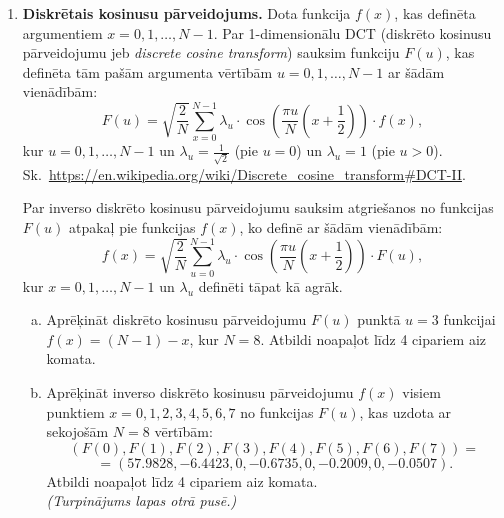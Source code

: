 \documentclass[a4paper]{article}
\begin{document}
\begin{enumerate}
\item {\bf Diskrētais kosinusu pārveidojums.}
Dota funkcija $f(x)$, kas definēta argumentiem $x=0,1,\ldots,N-1$. 
Par 1-dimensionālu DCT (diskrēto kosinusu pārveidojumu jeb {\em discrete cosine transform}) sauksim 
funkciju $F(u)$, kas definēta tām pašām argumenta vērtībām $u=0,1,\ldots,N-1$ 
ar šādām vienādībām: 
$$F(u) = \sqrt{\frac{2}{N}} \sum\limits_{x=0}^{N-1} \lambda_u \cdot \cos \left( \frac{\pi u}{N}\left(  x+\frac{1}{2} \right) \right) \cdot f(x),$$
kur $u=0,1,\ldots,N-1$ un $\lambda_u = \frac{1}{\sqrt{2}}$ (pie $u=0$) un $\lambda_u = 1$ (pie $u>0$).\\
Sk.\ \url{https://en.wikipedia.org/wiki/Discrete_cosine_transform#DCT-II}.

Par inverso diskrēto kosinusu pārveidojumu sauksim atgriešanos no funkcijas $F(u)$ atpakaļ pie funkcijas $f(x)$, 
ko definē ar šādām vienādībām:
$$f(x) = \sqrt{\frac{2}{N}} \sum\limits_{u=0}^{N-1} \lambda_u \cdot \cos \left( \frac{\pi u}{N}\left(  x+\frac{1}{2} \right) \right) \cdot F(u),$$
kur $x=0,1,\ldots,N-1$ un $\lambda_u$ definēti tāpat kā agrāk.
\begin{enumerate}[(a)]
\item 
Aprēķināt diskrēto kosinusu pārveidojumu $F(u)$ punktā $u=3$
funkcijai\\ $f(x) = (N-1)-x$, kur $N=8$. 
Atbildi noapaļot līdz 4 cipariem aiz komata.
\item 
Aprēķināt inverso diskrēto kosinusu pārveidojumu $f(x)$ visiem 
punktiem $x=0,1,2,3,4,5,6,7$ no funkcijas $F(u)$, kas uzdota ar
sekojošām $N=8$ vērtībām:
$$(F(0),F(1),F(2),F(3),F(4),F(5),F(6),F(7)) =$$
$$ = (57.9828,-6.4423,0,-0.6735,0,-0.2009,0,-0.0507).$$
Atbildi noapaļot līdz 4 cipariem aiz komata.\\
{\em (Turpinājums lapas otrā pusē.)}
\end{enumerate}


\end{enumerate}
\end{document}

